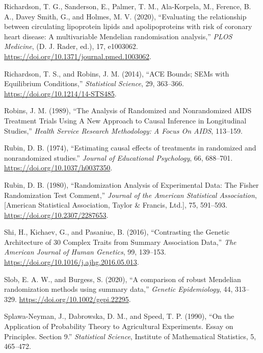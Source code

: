 \documentclass[
]{article}
\theoremstyle{plain}
\begin{document}
\leavevmode\hypertarget{ref-richardson_evaluating_2020}{}%
Richardson, T. G., Sanderson, E., Palmer, T. M., Ala-Korpela, M., Ference, B. A., Davey Smith, G., and Holmes, M. V. (2020), ``Evaluating the relationship between circulating lipoprotein lipids and apolipoproteins with risk of coronary heart disease: A multivariable Mendelian randomisation analysis,'' \emph{PLOS Medicine}, (D. J. Rader, ed.), 17, e1003062. \url{https://doi.org/10.1371/journal.pmed.1003062}.

\leavevmode\hypertarget{ref-richardson_ace_2014}{}%
Richardson, T. S., and Robins, J. M. (2014), ``ACE Bounds; SEMs with Equilibrium Conditions,'' \emph{Statistical Science}, 29, 363--366. \url{https://doi.org/10.1214/14-STS485}.

\leavevmode\hypertarget{ref-robins_analysis_1989}{}%
Robins, J. M. (1989), ``The Analysis of Randomized and Nonrandomized AIDS Treatment Trials Using A New Approach to Causal Inference in Longitudinal Studies,'' \emph{Health Service Research Methodology: A Focus On AIDS}, 113--159.

\leavevmode\hypertarget{ref-rubin_estimating_1974}{}%
Rubin, D. B. (1974), ``Estimating causal effects of treatments in randomized and nonrandomized studies.'' \emph{Journal of Educational Psychology}, 66, 688--701. \url{https://doi.org/10.1037/h0037350}.

\leavevmode\hypertarget{ref-rubin_randomization_1980}{}%
Rubin, D. B. (1980), ``Randomization Analysis of Experimental Data: The Fisher Randomization Test Comment,'' \emph{Journal of the American Statistical Association}, {[}American Statistical Association, Taylor \& Francis, Ltd.{]}, 75, 591--593. \url{https://doi.org/10.2307/2287653}.

\leavevmode\hypertarget{ref-shi_contrasting_2016}{}%
Shi, H., Kichaev, G., and Pasaniuc, B. (2016), ``Contrasting the Genetic Architecture of 30 Complex Traits from Summary Association Data,'' \emph{The American Journal of Human Genetics}, 99, 139--153. \url{https://doi.org/10.1016/j.ajhg.2016.05.013}.

\leavevmode\hypertarget{ref-slob_comparison_2020}{}%
Slob, E. A. W., and Burgess, S. (2020), ``A comparison of robust Mendelian randomization methods using summary data,'' \emph{Genetic Epidemiology}, 44, 313--329. \url{https://doi.org/10.1002/gepi.22295}.

\leavevmode\hypertarget{ref-splawa-neyman_application_1990}{}%
Splawa-Neyman, J., Dabrowska, D. M., and Speed, T. P. (1990), ``On the Application of Probability Theory to Agricultural Experiments. Essay on Principles. Section 9.'' \emph{Statistical Science}, Institute of Mathematical Statistics, 5, 465--472.
\end{document}
